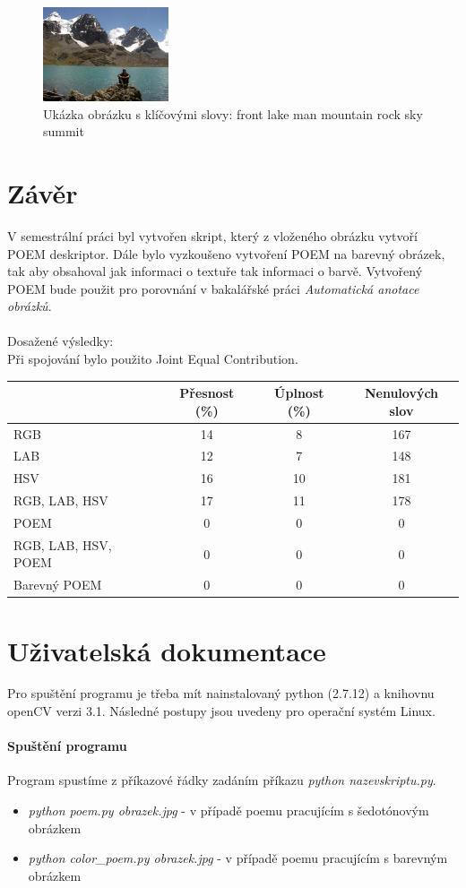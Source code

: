 \documentclass{report}
\begin{document}
\begin{figure}[h]
		\centering
		\includegraphics[width=140px]{./img/iaprtc12.jpg}	
		\caption{Ukázka obrázku s klíčovými slovy: front lake man mountain rock sky summit}
\end{figure}
 
\chapter{Závěr}
V semestrální práci byl vytvořen skript, který z vloženého obrázku vytvoří POEM deskriptor. Dále bylo vyzkoušeno vytvoření POEM na barevný obrázek, tak aby obsahoval jak informaci o textuře tak informaci o barvě. Vytvořený POEM bude použit pro porovnání v bakalářské práci \textit{Automatická anotace obrázků}. \\
\\
Dosažené výsledky: \\
Při spojování bylo použito Joint Equal Contribution. \cite{JEC} 

\begin{tabular}{l*{3}{c}}
	          		& Přesnost (\%) & Úplnost (\%) & Nenulových slov \\
\hline
RGB						& 14 & 8 & 167 \\
LAB	  			  		& 12 & 7 & 148  \\
HSV            			& 16 & 10 & 181  \\
RGB, LAB, HSV      		& 17 & 11 & 178  \\
POEM		     		& 0 & 0 & 0  \\
RGB, LAB, HSV, POEM		& 0 & 0 & 0  \\
Barevný POEM			& 0 & 0 & 0  \\
\end{tabular}


\chapter{Uživatelská dokumentace}
Pro spuštění programu je třeba mít nainstalovaný python (2.7.12) a knihovnu openCV verzi 3.1. Následné postupy jsou uvedeny pro operační systém Linux.

\subsubsection{Spuštění programu}
Program spustíme z příkazové řádky zadáním příkazu \textit{python nazevskriptu.py}. 
\begin{itemize}
	\item \textit{python poem.py obrazek.jpg} - v případě poemu pracujícím s šedotónovým obrázkem
	\item \textit{python color\_poem.py obrazek.jpg} - v případě poemu pracujícím s barevným obrázkem
\end{itemize}
\end{document}

